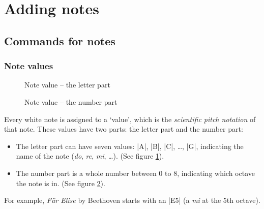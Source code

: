 \section{Adding notes}\label{sec:music-notes}
\subsection{Commands for notes}\label{sec:music-notes:commands}
\subsubsection{Note values}\label{sec:music-notes:commands:note-values}
\begin{figure}[t]
  \centering
  \caption{Note value -- the letter part}
  \label{fig:music-notes:commands:note-values:letter}
\end{figure}
\begin{figure}[t]
  \centering
  \caption{Note value -- the number part}
  \label{fig:music-notes:commands:note-values:number}
\end{figure}
Every white note is assigned to a `value', which is the \emph{scientific pitch 
notation} of that note. These values have two parts: the letter part and the 
number part:
\begin{itemize}
  \item The letter part can have seven values: |A|, |B|, |C|, \dots, |G|, 
  indicating the name of the note (\emph{do}, \emph{re}, \emph{mi}, \dots). (See 
  figure \ref{fig:music-notes:commands:note-values:letter}).
  \item The number part is a whole number between $0$ to $8$, indicating which 
  octave the note is in. (See figure \ref{fig:music-notes:commands:note-values:number}).
\end{itemize}
For example, \emph{F\"ur Elise} by Beethoven starts with an |E5| (a \emph{mi} at the 
5th octave).

